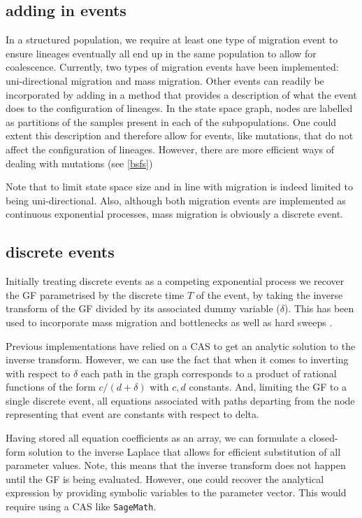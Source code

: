 \documentclass[10pt, a4]{article}
\begin{document}
\subsection{adding in events}

In a structured population, we require at least one type of migration event to ensure lineages eventually all end up in the same population to allow for coalescence. Currently, two types of migration events have been implemented: uni-directional migration and mass migration. Other events can readily be incorporated by adding in a method that provides a description of what the event does to the configuration of lineages. In the state space graph, nodes are labelled as partitions of the samples present in each of the subpopulations. One could extent this description and therefore allow for events, like mutations, that do not affect the configuration of lineages. However, there are more efficient ways of dealing with mutations (see \ref{bsfs})

Note that to limit state space size and in line with \citet{Lohse2016} migration is indeed limited to being uni-directional. Also, although both migration events are implemented as continuous exponential processes, mass migration is obviously a discrete event.

\subsection{discrete events} \label{discrete_events}

Initially treating discrete events as a competing exponential process we recover the GF parametrised by the discrete time $T$ of the event, by taking the inverse transform of the GF divided by its associated dummy variable ($\delta$). This has been used to incorporate mass migration and bottlenecks \citep{Lohse2011, Bunnefeld2015} as well as hard sweeps \citep{Bisschop2021}. 

Previous implementations have relied on a CAS to get an analytic solution to the inverse transform. However, we can use the fact that when it comes to inverting with respect to $\delta$ each path in the graph corresponds to a product of rational functions of the form $c/(d + \delta)$ with $c, d$ constants. And, limiting the GF to a single discrete event, all equations associated with paths departing from the node representing that event are constants with respect to delta.

Having stored all equation coefficients as an array, we can formulate a closed-form solution to the inverse Laplace that allows for efficient substitution of all parameter values. Note, this means that the inverse transform does not happen until the GF is being evaluated. However, one could recover the analytical expression by providing symbolic variables to the parameter vector. This would require using a CAS like \texttt{SageMath}.
\end{document}
